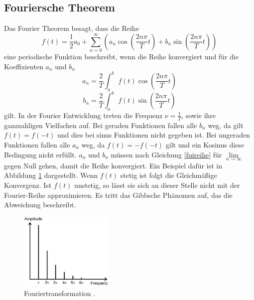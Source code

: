 \subsection{Fouriersche Theorem}
Das Fourier Theorem besagt, dass die Reihe
\begin{equation}
f(t)=\frac{1}{2}a_0+\sum_{n=0}^\infty\left(a_n \cos\left(\frac{2n\pi}{T}t\right)
+b_n\sin\left(\frac{2n\pi}{T}t\right)\right)
\label{fuireihe}
\end{equation}
eine periodische Funktion beschreibt, wenn die Reihe konvergiert und für die
Koeffizienten $a_n$ und $b_n$
\begin{equation}
  a_n=\frac{2}{T}\int_a^b\,\,f(t)\cos\left(\frac{2n\pi}{T}t\right)
  \label{fuikoeffizient_a}
\end{equation}
\begin{equation}
  b_n=\frac{2}{T}\int_a^b\,\,f(t)\sin\left(\frac{2n\pi}{T}t\right)
  \label{fuikoeffizient_b}
\end{equation}
gilt. In der Fourier Entwicklung treten die Frequenz $\nu=\frac{1}{T}$, sowie
ihre ganzzahligen Vielfachen auf. Bei geraden Funktionen fallen alle $b_n$ weg,
da gilt $f(t)=f(-t)$ und dies bei sinus Funktionen nicht gegeben ist. Bei
ungeraden Funktionen fallen alle $a_n$ weg, da $f(t)=-f(-t)$ gilt und ein Kosinus
diese Bedingung nicht erfüllt. $a_n$ und $b_n$ müssen nach Gleichung
\eqref{fuireihe} für $\lim\limits_{n \to \infty}$ gegen Null gehen, damit die
Reihe konvergiert. Ein Beispiel dafür ist in Abbildung \ref{fig:Fouriertrafo}
dargestellt. Wenn $f(t)$ stetig ist folgt die Gleichmäßige Konvergenz. Ist $f(t)$
unstetig, so lässt sie sich an dieser Stelle nicht mit der Fourier-Reihe
approximieren. Es tritt das Gibbsche Phänomen auf, das die Abweichung beschreibt.
\begin{figure}
  \centering
  \includegraphics[width=0.4\textwidth]{Fouriertrafo.png}
  \caption{Fouriertransformation \cite{sample}.}
  \label{fig:Fouriertrafo}
\end{figure}
